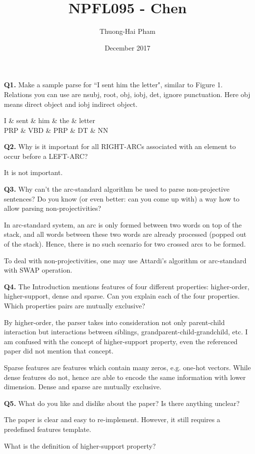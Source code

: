 \documentclass{article}
\title{NPFL095 - Chen}
\author{Thuong-Hai Pham}
\date{December 2017}
\begin{document}
\maketitle

\textbf{Q1.} Make a sample parse for ``I sent him the letter", similar to Figure 1. Relations you can use are {nsubj, root, obj, iobj, det}, ignore punctuation. Here obj means direct object and iobj indirect object.

\begin{dependency}
    \begin{deptext}[column sep=1.8em]
        I \& sent \& him \& the \& letter \\
        PRP \& VBD \& PRP \& DT \& NN \\
    \end{deptext}
\end{dependency} 

\bigskip

\textbf{Q2.} Why is it important for all RIGHT-ARCs associated with an element to occur before a LEFT-ARC?

It is not important.

\bigskip

\textbf{Q3.} Why can't the arc-standard algorithm be used to parse non-projective sentences? Do you know (or even better: can you come up with) a way how to allow parsing non-projectivities?

In arc-standard system, an arc is only formed between two words on top of the stack, and all words between these two words are already processed (popped out of the stack). Hence, there is no such scenario for two crossed arcs to be formed.

To deal with non-projectivities, one may use Attardi's algorithm or arc-standard with SWAP operation.

\bigskip

\textbf{Q4.} The Introduction mentions features of four different properties: higher-order, higher-support, dense and sparse. Can you explain each of the four properties. Which properties pairs are mutually exclusive?

By higher-order, the parser takes into consideration not only parent-child interaction but interactions between siblings, grandparent-child-grandchild, etc. I am confused with the concept of higher-support property, even the referenced paper did not mention that concept.

Sparse features are features which contain many zeros, e.g. one-hot vectors. While dense features do not, hence are able to encode the same information with lower dimension. Dense and sparse are mutually exclusive.

\bigskip

\textbf{Q5.} What do you like and dislike about the paper? Is there anything unclear?

The paper is clear and easy to re-implement. However, it still requires a predefined features template.

What is the definition of higher-support property?
\end{document}
